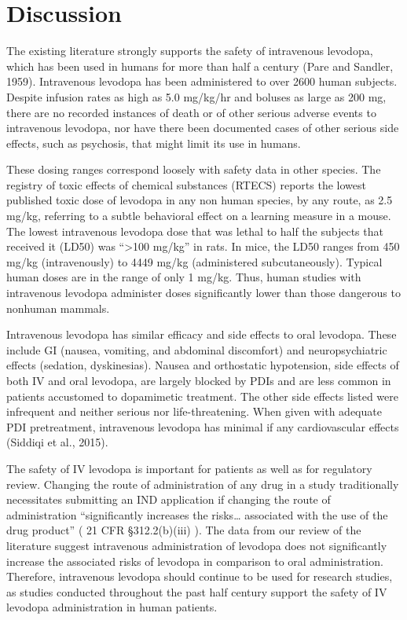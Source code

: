 \section{Discussion}
The existing literature strongly supports the safety of intravenous levodopa, which has been used in humans for more than half a century (Pare and Sandler, 1959).  Intravenous levodopa has been administered to over 2600 human subjects.  Despite infusion rates as high as 5.0 mg/kg/hr and boluses as large as 200 mg, there are no recorded instances of death or of other serious adverse events to intravenous levodopa, nor have there been documented cases of other serious side effects, such as psychosis, that might limit its use in humans.  

These dosing ranges correspond loosely with safety data in other species. The registry of toxic effects of chemical substances (RTECS) reports the lowest published toxic dose of levodopa in any non human species, by any route, as 2.5 mg/kg, referring to a subtle behavioral effect on a learning measure in a mouse.  The lowest intravenous levodopa dose that was lethal to half the subjects that received it (LD50) was ``>100 mg/kg'' in rats.  In mice, the LD50 ranges from 450 mg/kg (intravenously) to 4449 mg/kg (administered subcutaneously).  Typical human doses are in the range of only 1 mg/kg.  Thus, human studies with intravenous levodopa administer doses significantly lower than those dangerous to nonhuman mammals. 

Intravenous levodopa has similar efficacy and side effects to oral levodopa.  These include GI (nausea, vomiting, and abdominal discomfort) and neuropsychiatric effects (sedation, dyskinesias).  Nausea and orthostatic hypotension, side effects of both IV and oral levodopa, are largely blocked by PDIs and are less common in patients accustomed to dopamimetic treatment.  The other side effects listed were infrequent and neither serious nor life-threatening. When given with adequate PDI pretreatment, intravenous levodopa has minimal if any cardiovascular effects (Siddiqi et al., 2015).

The safety of IV levodopa is important for patients as well as for regulatory review.  Changing the route of administration of any drug in a study traditionally necessitates submitting an IND application if changing the route of administration “significantly increases the risks… associated with the use of the drug product” ( 21 CFR \S 312.2(b)(iii) ).  The data from our review of the literature suggest intravenous administration of levodopa does not significantly increase the associated risks of levodopa in comparison to oral administration.  Therefore, intravenous levodopa should continue to be used for research studies, as studies conducted throughout the past half century support the safety of IV levodopa administration in human patients.